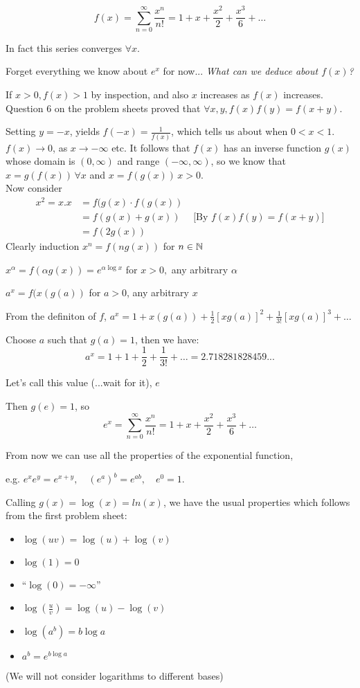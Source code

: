 \documentclass[twoside]{scrartcl}
\begin{document}
\[f(x) = \sum_{n=0}^{\infty} \frac{x^n}{n!} = 1 + x + \frac{x^2}{2} + \frac{x^3}{6} + \dots\]

In fact this series converges $\forall x$.

Forget everything we know about $e^x$ for now... \emph{What can we deduce about $f(x)$?}

If $x>0, f(x) > 1$ by inspection, and also $x$ increases as $f(x)$ increases. Question 6 on the problem sheets proved that $\forall x,y, f(x)f(y) = f(x+y)$. 

Setting $y = -x$, yields $f(-x) = \frac{1}{f(x)}$, which tells us about when $ 0<x <1$. $f(x) \to 0$, as $x \to -\infty$ etc. It follows that $f(x)$ has an inverse function $g(x)$ whose domain is $(0,\infty)$ and range $(-\infty,\infty)$, so we know that $x = g(f(x)) \, \forall x$ and $x = f(g(x)) \, x>0$.\\

Now consider 
\[
\begin{aligned}
  x^2 = x.x &= f(g(x)\cdot f(g(x))\\
  &= f(g(x) + g(x)) \quad \mbox{ [By $f(x)f(y) = f(x+y)$]}\\
  &= f(2g(x))
\end{aligned}
\]
Clearly induction $x^n = f(ng(x))$ for $n \in \mathbb{N}$\\

\begin{definition} 
$x^{\alpha} = f(\alpha g(x)) = e^{\alpha \log x}$ for $x >0,$ any arbitrary $\alpha$

$a^x = f(x(g(a))$ for $a > 0$, any arbitrary $x$
\end{definition}


From the definiton of $f$, $a^x = 1 + x(g(a)) + \frac{1}{2} [xg(a)]^2 + \frac{1}{3!}[xg(a)]^3 + \dots$

Choose $a$ such that $g(a) = 1$, then we have:
\[a^x = 1 + 1 + \frac{1}{2} + \frac{1}{3!} + \dots = 2.718281828459...\]

Let's call this value (...wait for it), $e$

 Then $g(e) = 1$, so 
 \[e^x = \sum_{n=0}^{\infty} \frac{x^n}{n!} = 1 + x + \frac{x^2}{2} + \frac{x^3}{6} + \dots \]

From now we can use all the properties of the exponential function,

 e.g. $e^xe^y = e^{x+y}, \quad (e^a)^b = e^{ab}, \quad e^0 = 1$. 

Calling $g(x) = \log(x) = ln(x)$, we have the usual properties which follows from the first problem sheet:\\
\begin{itemize}
\item $\log(uv) = \log(u) + \log(v)$
\item $\log(1) = 0$
\item ``$\log(0)= -\infty$''
\item $\log (\frac{u}{v}) = \log(u) - \log(v)$
\item $\log(a^b) = b\log a$
\item $a^b = e^{b \log a}$
\end{itemize}
(We will not consider logarithms to different bases)\\
\end{document}
